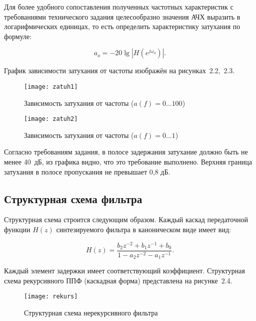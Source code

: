 Для более удобного сопоставления полученных частотных характеристик с
требованиями технического задания целесообразно значения АЧХ выразить
в логарифмических единицах, то есть определить характеристику
затухания по формуле:

\begin{equation*}
  a_o = -20 \lg\left|H(e^{j\omega_0})\right|.
\end{equation*}

График зависимости затухания от частоты изображён на рисунках~2.2,~2.3.

\begin{figure}[h!]
  \label{fig:zatuh1}
  \texttt{[image: zatuh1]}
  \caption{Зависимость затухания от частоты ($a(f) = 0 \ldots 100$)}
\end{figure}

\begin{figure}[h!]
  \label{fig:zatuh2}
  \texttt{[image: zatuh2]}
  \caption{Зависимость затухания от частоты ($a(f) = 0 \ldots 1$)}
\end{figure}

Согласно требованиям задания, в полосе задержания затухание должно
быть не менее 40~дБ, из графика видно, что это требование
выполнено. Верхняя граница затухания в полосе пропускания не превышает
0{,}8 дБ.

\subsection{Структурная схема фильтра}
\label{sec:scheme_nerekurs}

Структурная схема строится следующим образом. Каждый каскад
передаточной функции $H(z)$ синтезируемого фильтра в каноническом виде
имеет вид:

\begin{equation*}
  H(z) = \frac{b_2z^{-2}+b_1z^{-1}+b_0}{1-a_2z^{-2}-a_1z^{-1}}.
\end{equation*}

Каждый элемент задержки имеет соответствующий коэффициент.
Структурная схема рекурсивного ППФ (каскадная форма) представлена на
рисунке~2.4.

\begin{figure}[p]
  \label{nerekurs_dia}
  \texttt{[image: rekurs]}
  \caption{Структурная схема нерекурсивного фильтра}
\end{figure}
\newpage


